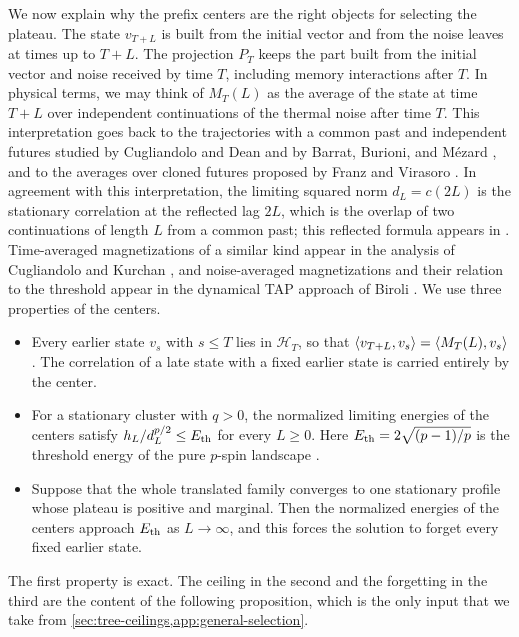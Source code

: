 We now explain why the prefix centers are the right objects for selecting the plateau. The state $v_{T+L}$ is built from the initial vector and from the noise leaves at times up to $T+L$. The projection $P_T$ keeps the part built from the initial vector and noise received by time $T$, including memory interactions after $T$. In physical terms, we may think of $M_T(L)$ as the average of the state at time $T+L$ over independent continuations of the thermal noise after time $T$. %
This interpretation goes back to the trajectories with a common past and independent futures studied by Cugliandolo and Dean \cite[arXiv version~1, Section~II]{cugliandolodean1995} and by Barrat, Burioni, and M\'ezard \cite[Section~4]{bbm1996}, and to the averages over cloned futures proposed by Franz and Virasoro \cite[arXiv version~3, Section~III]{franzvirasoro2000}. In agreement with this interpretation, the limiting squared norm $d_L=c(2L)$ is the stationary correlation at the reflected lag $2L$, which is the overlap of two continuations of length $L$ from a common past; this reflected formula appears in \cite[Section~2, Equation~(9)]{bbm1996}. Time-averaged magnetizations of a similar kind appear in the analysis of Cugliandolo and Kurchan \cite[arXiv version~1, Section~5.1]{ck1994}, and noise-averaged magnetizations and their relation to the threshold appear in the dynamical TAP approach of Biroli \cite[arXiv version~2, Section~III.B]{biroli1999}. We use three properties of the centers.
\begin{itemize}
\item Every earlier state $v_s$ with $s\le T$ lies in $\mathcal H_T$, so that $\left\langle v_{T+L},v_s\right\rangle=\left\langle M_T(L),v_s\right\rangle$. The correlation of a late state with a fixed earlier state is carried entirely by the center.
\item For a stationary cluster with $q>0$, the normalized limiting energies of the centers satisfy $h_L/d_L^{p/2}\le E_{\mathrm{th}}$ for every $L\ge0$. Here $E_{\mathrm{th}}=2\sqrt{(p-1)/p}$ is the threshold energy of the pure $p$-spin landscape \cite[Equation~(2.13)]{abc2013}.
\item Suppose that the whole translated family converges to one stationary profile whose plateau is positive and marginal. Then the normalized energies of the centers approach $E_{\mathrm{th}}$ as $L\to\infty$, and this forces the solution to forget every fixed earlier state.
\end{itemize}
The first property is exact. The ceiling in the second and the forgetting in the third are the content of the following proposition, which is the only input that we take from \cref{sec:tree-ceilings,app:general-selection}.

